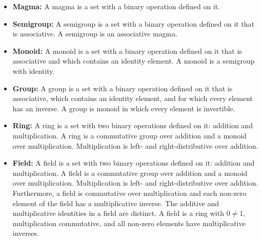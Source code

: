 \documentclass[12pt]{article}
\begin{document}
\begin{itemize}
\item{\textbf{Magma:} A magma is a set with a binary operation defined on it.}
\item{\textbf{Semigroup:} A semigroup is a set with a binary operation defined on it that is associative. A semigroup is an associative magma.}
\item{\textbf{Monoid:} A monoid is a set with a binary operation defined on it that is associative and which contains an identity element. A monoid is a semigroup with identity.}
\item{\textbf{Group:} A group is  a set with a binary operation defined on it that is associative, which contains an identity element, and for which every element has an inverse. A group is monoid in which every element is invertible.}
\item{\textbf{Ring:} A ring is a set with two binary operations defined on it: addition and multiplication. A ring is a commutative group over addition and a monoid over multiplication. Multiplication is left- and right-distributive over addition.}
\item{\textbf{Field:} A field is a set with two binary operations defined on it: addition and multiplication. A field is a commutative group over addition and a monoid over multiplication. Multiplication is left- and right-distributive over addition. Furthermore, a field is commutative over multiplication and each non-zero element of the field has a multiplicative inverse. The additive and multiplicative identities in a field are distinct. A field is a ring with $0\neq 1$, multiplication commutative, and all non-zero elements have multiplicative inverses.}
\end{itemize}
\end{document}
